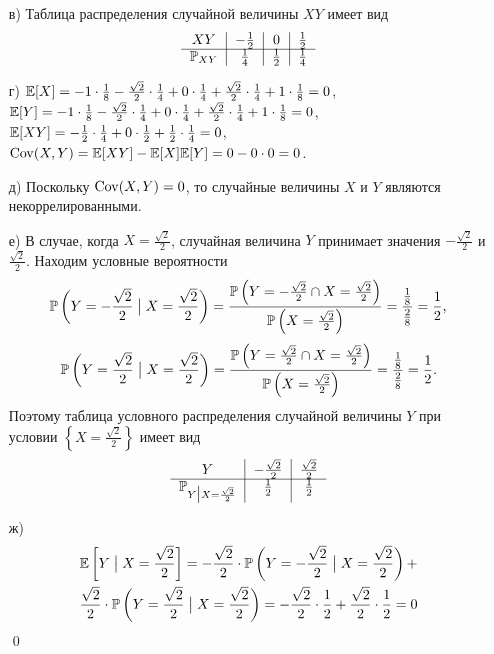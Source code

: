 \begin{enumerate}
\begin{enumerate}
\item[в)] Таблица распределения случайной величины $XY$ имеет вид
\[
\begin{tabular}{c|c|c|c}
  $XY$               & $-\frac{1}{2}$     & $0$             & $\frac{1}{2}$  \\ \cline{1-4}
  $\P_{XY}$  & $\frac{1}{4}$      & $\frac{1}{2}$   & $\frac{1}{4}$  \\
\end{tabular}
\]

\item[г)] $\E[X] = -1 \cdot \frac{1}{8} - \frac{\sqrt{2}}{2} \cdot \frac{1}{4} + 0 \cdot \frac{1}{4} + \frac{\sqrt{2}}{2} \cdot \frac{1}{4} + 1 \cdot \frac{1}{8} = 0$,
$\E[Y] = -1 \cdot \frac{1}{8} - \frac{\sqrt{2}}{2} \cdot \frac{1}{4} + 0 \cdot \frac{1}{4} + \frac{\sqrt{2}}{2} \cdot \frac{1}{4} + 1 \cdot \frac{1}{8} = 0$,
$\E[XY] = -\frac{1}{2} \cdot \frac{1}{4} + 0 \cdot \frac{1}{2} + \frac{1}{2} \cdot \frac{1}{4} = 0$,
$\Cov(X,Y) = \E[XY] - \E[X]\E[Y] = 0 - 0 \cdot 0 = 0$.

\item[д)] Поскольку $\Cov(X,Y) = 0$, то случайные величины $X$ и $Y$ являются некоррелированными.

\item[е)] В случае, когда $X = \frac{\sqrt{2}}{2}$, случайная величина $Y$ принимает значения $-\frac{\sqrt{2}}{2}$ и $\frac{\sqrt{2}}{2}$. Находим условные вероятности
\[
\P\left(Y=-\frac{\sqrt{2}}{2} \bigm| X = \frac{\sqrt{2}}{2}\right) =
\frac{\P\left(Y=-\frac{\sqrt{2}}{2} \cap X = \frac{\sqrt{2}}{2}\right)}{\P\left(X = \frac{\sqrt{2}}{2}\right)} = \frac{\frac{1}{8}}{\frac{2}{8}} = \frac{1}{2} \text{,}
\]
\[
\P\left(Y=\frac{\sqrt{2}}{2} \bigm| X = \frac{\sqrt{2}}{2}\right) =
\frac{\P\left(Y=\frac{\sqrt{2}}{2} \cap X = \frac{\sqrt{2}}{2}\right)}{\P\left(X = \frac{\sqrt{2}}{2}\right)} = \frac{\frac{1}{8}}{\frac{2}{8}} = \frac{1}{2} \text{.}
\]
Поэтому таблица условного распределения случайной величины $Y$ при условии $\left\{X = \frac{\sqrt{2}}{2}\right\}$ имеет вид
\[
\begin{tabular}{c|c|c}
  $Y$                                                             & $-\frac{\sqrt{2}}{2}$     & $\frac{\sqrt{2}}{2}$    \\ \cline{1-3}
  $\P_{Y\bigm|X = \frac{\sqrt{2}}{2}}$     & $\frac{1}{2}$             & $\frac{1}{2}$           \\
\end{tabular}
\]

\item[ж)]
\begin{multline*}
\E\left[Y\bigm|X = \frac{\sqrt{2}}{2}\right] = -\frac{\sqrt{2}}{2} \cdot \P\left(Y=-\frac{\sqrt{2}}{2} \bigm| X = \frac{\sqrt{2}}{2}\right) + \\
\frac{\sqrt{2}}{2} \cdot \P\left(Y=\frac{\sqrt{2}}{2} \bigm| X = \frac{\sqrt{2}}{2}\right) = -\frac{\sqrt{2}}{2} \cdot \frac{1}{2} + \frac{\sqrt{2}}{2} \cdot \frac{1}{2} = 0
\end{multline*}
\qed
\end{enumerate}

\end{enumerate}

